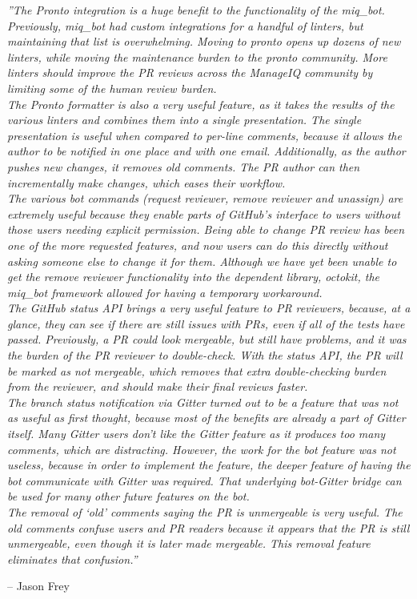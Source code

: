 \begin{displayquote}
\textit{
''The Pronto integration is a huge benefit to the functionality of the miq\_bot. Previously, miq\_bot had custom integrations for a handful of linters, but maintaining that list is overwhelming. Moving to pronto opens up dozens of new linters, while moving the maintenance burden to the pronto community. More linters should improve the PR reviews across the ManageIQ community by limiting some of the human review burden.\\[0.5em]
The Pronto formatter is also a very useful feature, as it takes the results of the various linters and combines them into a single presentation. The single presentation is useful when compared to per-line comments, because it allows the author to be notified in one place and with one email. Additionally, as the author pushes new changes, it removes old comments. The PR author can then incrementally make changes, which eases their workflow.\\[0.5em]
The various bot commands (request reviewer, remove reviewer and unassign) are extremely useful because they enable parts of GitHub’s interface to users without those users needing explicit permission. Being able to change PR review has been one of the more requested features, and now users can do this directly without asking someone else to change it for them. Although we have yet been unable to get the remove reviewer functionality into the dependent library, octokit, the miq\_bot framework allowed for having a temporary workaround.\\[0.5em]
The GitHub status API brings a very useful feature to PR reviewers, because, at a glance, they can see if there are still issues with PRs, even if all of the tests have passed. Previously, a PR could look mergeable, but still have problems, and it was the burden of the PR reviewer to double-check. With the status API, the PR will be marked as not mergeable, which removes that extra double-checking burden from the reviewer, and should make their final reviews faster.\\[0.5em]
The branch status notification via Gitter turned out to be a feature that was not as useful as first thought, because most of the benefits are already a part of Gitter itself. Many Gitter users don’t like the Gitter feature as it produces too many comments, which are distracting. However, the work for the bot feature was not useless, because in order to implement the feature, the deeper feature of having the bot communicate with Gitter was required. That underlying bot-Gitter bridge can be used for many other future features on the bot.\\[0.5em]
The removal of `old' comments saying the PR is unmergeable is very useful. The old comments confuse users and PR readers because it appears that the PR is still unmergeable, even though it is later made mergeable. This removal feature eliminates that confusion.''\\[-2em]
}
    \begin{flushright}
        -- Jason Frey
    \end{flushright}
\end{displayquote}


